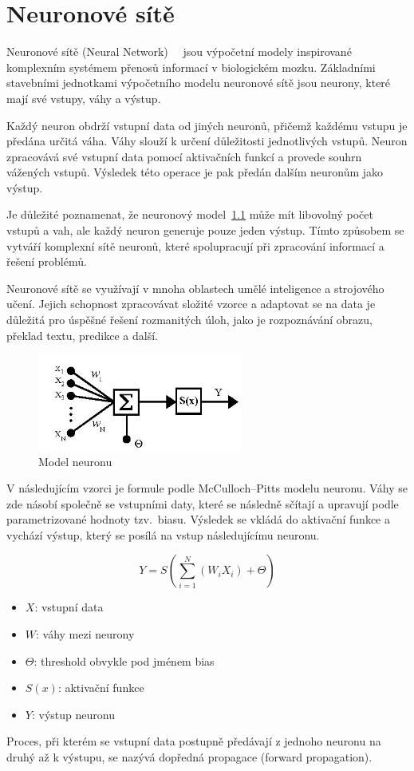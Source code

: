 \chapter{Neuronové sítě}
Neuronové sítě (Neural Network)~\cite{link1}~\cite{link20} jsou výpočetní modely inspirované komplexním systémem přenosů informací v biologickém mozku.
Základními stavebními jednotkami výpočetního modelu neuronové sítě jsou neurony, které mají své vstupy, váhy a výstup.

Každý neuron obdrží vstupní data od jiných neuronů, přičemž každému vstupu je předána určitá váha.
Váhy slouží k určení důležitosti jednotlivých vstupů.
Neuron zpracovává své vstupní data pomocí aktivačních funkcí a provede souhrn vážených vstupů.
Výsledek této operace je pak předán dalším neuronům jako výstup.

Je důležité poznamenat, že neuronový model~\ref{fig:Model neuronu} může mít libovolný počet vstupů a vah, ale každý neuron generuje pouze jeden výstup.
Tímto způsobem se vytváří komplexní sítě neuronů, které spolupracují při zpracování informací a řešení problémů.

Neuronové sítě se využívají v mnoha oblastech umělé inteligence a strojového učení.
Jejich schopnost zpracovávat složité vzorce a adaptovat se na data je důležitá pro úspěšné řešení rozmanitých úloh, jako je rozpoznávání obrazu, překlad textu, predikce a další.

\begin{figure}[H]
	\centering
	\includegraphics[width=0.6\textwidth]{Figures/NeuronModel.jpg}
	\caption{Model neuronu~\cite{link1}}\label{fig:Model neuronu}
\end{figure}

V následujícím vzorci je formule podle McCulloch–Pitts modelu neuronu.
Váhy se zde násobí společně se vstupními daty, které se následně sčítají a upravují podle parametrizované hodnoty tzv.\ biasu.
Výsledek se vkládá do aktivační funkce a vychází výstup, který se posílá na vstup následujícímu neuronu.

\[Y = S(\sum_{i=1}^{N}(W_{i} X_{i}) + \Theta)\]

\begin{itemize}
\item $X$: vstupní data
\item $W$: váhy mezi neurony
\item $\Theta$: threshold obvykle pod jménem bias
\item $S(x)$: aktivační funkce
\item $Y$: výstup neuronu
\end{itemize}
Proces, při kterém se vstupní data postupně předávají z jednoho neuronu na druhý až k výstupu, se nazývá dopředná propagace (forward propagation).


